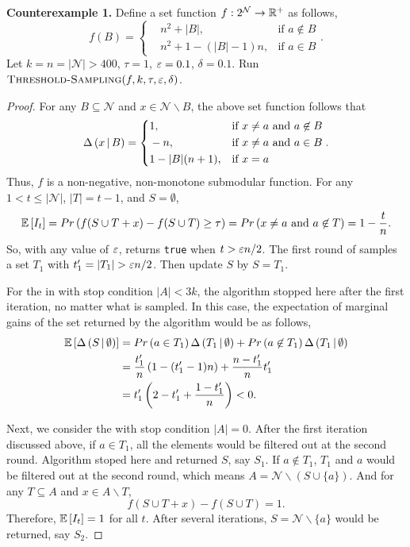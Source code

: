 \textbf{Counterexample 1.}
Define a set function $f: 2^{\mathcal{N}} \to \mathbb{R}^+$ as follows,
\begin{equation*}
  f(B)= \left\{
    \begin{aligned}
      &n^2 + |B|,&\text{if } a \not \in B\\
      &n^2 +1- (|B|-1)n, &\text{if }a \in B
    \end{aligned}
  \right. .
\end{equation*}
Let $k = n = |\mathcal{N}|>400$, $\tau=1$, $\varepsilon=0.1$, $\delta=0.1$.
Run $\textsc{Threshold-Sampling}(f, k, \tau, \varepsilon, \delta)$.
\begin{proof}
  For any $B \subseteq \mathcal{N}$ and $x\in \mathcal{N} \backslash B$, 
  the above set function follows that
  \begin{equation*}
    \Delta \left( x \, | \, B \right)= \left\{
      \begin{aligned}
        &1,&&\text{if } x \neq a \text{ and } a \not \in B\\
        &-n,&&\text{if } x \neq a \text{ and } a \in B\\
        &1-|B|(n+1), &&\text{if } x = a
      \end{aligned}
    \right. .
  \end{equation*}
Thus, $f$ is a non-negative, non-monotone submodular function.
For any $1 < t \le |\mathcal{N}|$, $|T| = t-1$, and $S = \emptyset$,
\[\mathbb{E} \left[ I_t \right] = Pr \left( f( S \cup T  + x) - f( S \cup T ) \ge \tau  \right)
= Pr \left( x \neq a \text{ and } a \not \in T \right)
= 1-\frac{t}{n}.\]
So, with any value of $\varepsilon$, 
\reducedmean returns \texttt{true} when $t> \varepsilon n/2$.
The first round of \thresam
samples a set $T_1$ with $t_1'=|T_1| > \varepsilon n/2$.
Then update $S$ by $S = T_1$.

For the \thresam in  with stop condition
$|A| < 3k$, the algorithm stopped here after the first iteration,
no matter what is sampled.
In this case, the expectation of marginal gains of the set returned
by the algorithm would be as follows,
\begin{align*}
  \mathbb{E} \left[ \Delta \left( S \, | \, \emptyset \right) \right] &= Pr \left( a \in T_1 \right) \Delta \left( T_1 \, | \, \emptyset \right)
  + Pr \left( a \not \in T_1 \right) \Delta \left( T_1 \, | \, \emptyset \right)\\ 
  &= \frac{t_1'}{n}\left(1-(t_1'-1)n\right) + \frac{n-t_1'}{n}t_1' \\
  &= t_1'\left(2-t_1'+\frac{1-t_1'}{n}\right) < 0.
\end{align*}

Next, we consider the \thresam with stop condition $|A|=0$.
After the first iteration discussed above,
if $a \in T_1$, all the elements would be filtered out at the second round.
Algorithm stoped here and returned $S$, say $S_1$.
If $a \not \in T_1$, $T_1$ and $a$ would be filtered out at the second round,
which means $A = \mathcal{N} \backslash (S \cup \{a\})$.
And for any $T \subseteq A $ and 
$x \in A \backslash T$, 
\[f(S \cup T + x) - f(S \cup T) = 1.\]
Therefore, $\mathbb{E} \left[ I_t \right] = 1$ for all $t$.
After several iterations, $S = \mathcal{N} \backslash \{a\}$ would be returned, say $S_2$.


\end{proof}
